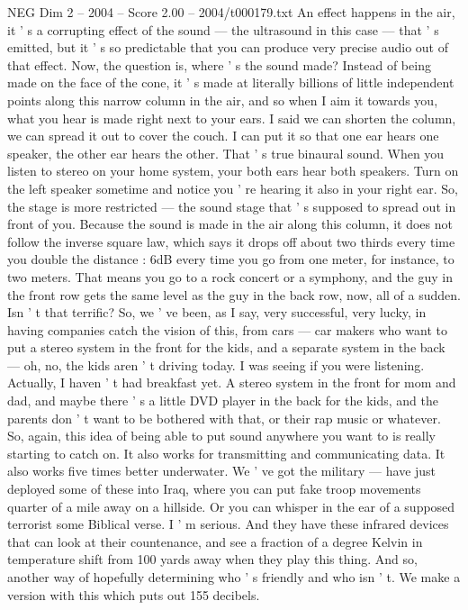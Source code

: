 \begin{textsample}{NEG Dim 2 – 2004 – Score 2.00 – 2004/t000179.txt}
An effect happens in the air, it ' s a corrupting effect of the sound — the ultrasound in this case — that ' s emitted, but it ' s so predictable that you can produce very precise audio out of that effect.
Now, the question is, where ' s the sound made?
Instead of being made on the face of the cone, it ' s made at literally billions of little independent points along this narrow column in the air, and so when I aim it towards you, what you hear is made right next to your ears.
I said we can shorten the column, we can spread it out to cover the couch.
I can put it so that one ear hears one speaker, the other ear hears the other.
That ' s true binaural sound.
When you listen to stereo on your home system, your both ears hear both speakers.
Turn on the left speaker sometime and notice you ' re hearing it also in your right ear.
So, the stage is more restricted — the sound stage that ' s supposed to spread out in front of you.
Because the sound is made in the air along this column, it does not follow the inverse square law, which says it drops off about two thirds every time you double the distance : 6dB every time you go from one meter, for instance, to two meters.
That means you go to a rock concert or a symphony, and the guy in the front row gets the same level as the guy in the back row, now, all of a sudden.
Isn ' t that terrific?
So, we ' ve been, as I say, very successful, very lucky, in having companies catch the vision of this, from cars — car makers who want to put a stereo system in the front for the kids, and a separate system in the back — oh, no, the kids aren ' t driving today.
I was seeing if you were listening.
Actually, I haven ' t had breakfast yet.
A stereo system in the front for mom and dad, and maybe there ' s a little DVD player in the back for the kids, and the parents don ' t want to be bothered with that, or their rap music or whatever.
So, again, this idea of being able to put sound anywhere you want to is really starting to catch on.
It also works for transmitting and communicating data.
It also works five times better underwater.
We ' ve got the military — have just deployed some of these into Iraq, where you can put fake troop movements quarter of a mile away on a hillside.
Or you can whisper in the ear of a supposed terrorist some Biblical verse.
I ' m serious.
And they have these infrared devices that can look at their countenance, and see a fraction of a degree Kelvin in temperature shift from 100 yards away when they play this thing.
And so, another way of hopefully determining who ' s friendly and who isn ' t.
We make a version with this which puts out 155 decibels.

\end{textsample}

